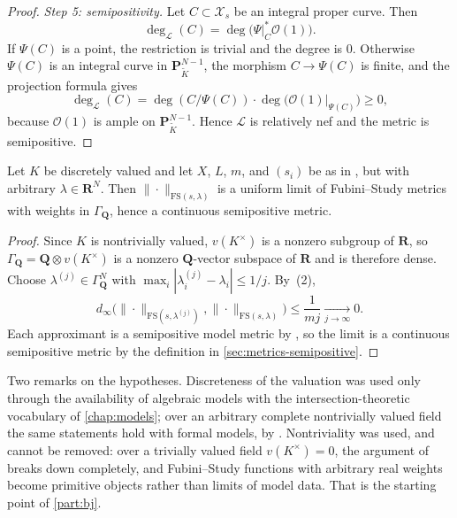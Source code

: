 \begin{proof}
\emph{Step 5: semipositivity.} Let $C\subset\mathcal X_s$ be an integral
proper curve. Then
\[
 \deg_{\mathcal L}(C)=\deg\bigl(\Psi|_C^*\mathcal O(1)\bigr).
\]
If $\Psi(C)$ is a point, the restriction is trivial and the degree is
$0$. Otherwise $\Psi(C)$ is an integral curve in
$\mathbf P^{N-1}_{\widetilde K}$, the morphism $C\to\Psi(C)$ is
finite, and the projection formula gives
\[
 \deg_{\mathcal L}(C)
 =\deg(C/\Psi(C))\cdot\deg\bigl(\mathcal O(1)|_{\Psi(C)}\bigr)\ge0,
\]
because $\mathcal O(1)$ is ample on
$\mathbf P^{N-1}_{\widetilde K}$. Hence
$\mathcal L$ is relatively nef and the metric is semipositive.
\end{proof}

\begin{proposition}
\label{prop:metrics-fs-real-weights}
Let $K$ be discretely valued and let $X$, $L$, $m$, and
$(s_i)$ be as in , but with arbitrary
$\lambda\in\mathbf R^N$. Then
$\|\cdot\|_{\mathrm{FS}(s,\lambda)}$ is a uniform limit of Fubini--Study
metrics with weights in $\Gamma_{\mathbf Q}$, hence a continuous
semipositive metric.
\end{proposition}

\begin{proof}
Since $K$ is nontrivially valued, $v(K^\times)$ is a nonzero subgroup of
$\mathbf R$, so $\Gamma_{\mathbf Q}=\mathbf Q\otimes v(K^\times)$ is a
nonzero $\mathbf Q$-vector subspace of $\mathbf R$ and is therefore
dense. Choose $\lambda^{(j)}\in\Gamma_{\mathbf Q}^N$ with
$\max_i|\lambda_i^{(j)}-\lambda_i|\le1/j$. By
\,(2),
\[
 d_\infty\bigl(\|\cdot\|_{\mathrm{FS}(s,\lambda^{(j)})},
 \|\cdot\|_{\mathrm{FS}(s,\lambda)}\bigr)\le\frac1{mj}
 \xrightarrow[j\to\infty]{}0 .
\]
Each approximant is a semipositive model metric by
, so the limit is a continuous semipositive
metric by the definition in \cref{sec:metrics-semipositive}.
\end{proof}

Two remarks on the hypotheses. Discreteness of the valuation was used only
through the availability of algebraic models with the intersection-theoretic
vocabulary of \cref{chap:models}; over an arbitrary complete nontrivially
valued field the same statements hold with formal models, by
. Nontriviality was used, and cannot be
removed: over a trivially valued field $v(K^\times)=0$, the argument of
 breaks down completely, and
Fubini--Study functions with arbitrary real weights become primitive objects
rather than limits of model data. That is the starting point of
\cref{part:bj}.

